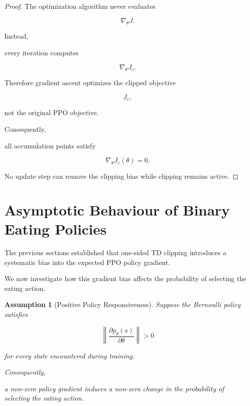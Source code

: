\documentclass[11pt]{article}
\newtheorem{assumption}{Assumption}
\begin{document}
\begin{proof}

The optimization algorithm never evaluates

\[
\nabla_\theta J.
\]

Instead,

every iteration computes

\[
\nabla_\theta J_c.
\]

Therefore gradient ascent optimizes the clipped objective

\[
J_c,
\]

not the original PPO objective.

Consequently,

all accumulation points satisfy

\[
\nabla_\theta J_c(\theta)=0.
\]

No update step can remove the clipping bias while clipping remains
active.

\end{proof}



\section{Asymptotic Behaviour of Binary Eating Policies}

The previous sections established that one-sided TD clipping
introduces a systematic bias into the expected PPO policy gradient.

We now investigate how this gradient bias affects the probability
of selecting the eating action.


\begin{assumption}[Positive Policy Responsiveness]

Suppose the Bernoulli policy satisfies

\[
\left\|
\frac{\partial p_\theta(s)}
{\partial\theta}
\right\|
>0
\]

for every state encountered during training.

Consequently,

a non-zero policy gradient induces a non-zero change in the
probability of selecting the eating action.

\end{assumption}
\end{document}
